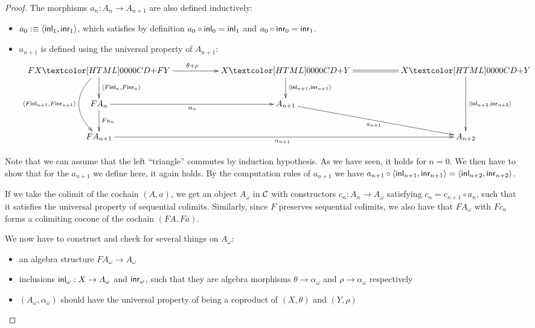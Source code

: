 \begin{proof}
  The morphisms $a_n : A_n \to A_{n+1}$ are also defined inductively:
  \begin{itemize}
  \item $a_0 \ddefeq \langle \inln{1}, \inrn{1} \rangle$, which
    satisfies by definition $a_0 \circ \inln{0} = \inln{1}$ and
    $a_0 \circ \inrn{0} = \inrn{1}$.
  \item $a_{n+1}$ is defined using the universal property of
    $A_{n+1}$:
    $$
    \xymatrix{
      \coproduct{FX}{FY} \ar[rr]^{\theta + \rho} \ar[d]^{\langle F \inln{n} , F \inrn{n} \rangle} 
      \ar@/_2pc/[dd]_{\langle F \inln{n+1} , F \inrn{n+1} \rangle}
      &&\coproduct{X}{Y} \ar[d]^{\langle \inln{n+1} , \inrn{n+1} \rangle} \ar@{=}[rr]
      &&\coproduct{X}{Y} \ar[dd]^{\langle \inln{n+2} , \inrn{n+2} \rangle} \\
      FA_n \ar[rr]_{\alpha_n} \ar[d]^{F a_n}
      &&A_{n+1} \ar[drr]_{a_{n+1}}
      \\
      FA_{n+1} \ar[rrrr]_{\alpha_{n+1}}
      &&&&A_{n+2}
    }
    $$
  \end{itemize}
  Note that we can assume that the left ``triangle'' commutes by
  induction hypothesis. As we have seen, it holds for $n = 0$. We then
  have to show that for the $a_{n+1}$ we define here, it again
  holds. By the computation rules of $a_{n+1}$ we have
  $a_{n+1} \circ \langle \inln{n+1} , \inrn{n+1} \rangle = \langle
  \inln{n+2} , \inrn{n+2} \rangle$.

  If we take the colimit of the cochain $(A,a)$, we get an object
  $A_{\omega}$ in $\mathcal{C}$ with constructors $c_n : A_n \to A_{\omega}$
  satisfying $c_n = c_{n+1} \circ a_n$, such that it satisfies the
  universal property of sequential colimits. Similarly, since $F$
  preserves sequential colimits, we also have that $FA_{\omega}$ with
  $Fc_n$ forms a colimiting cocone of the cochain $(FA,Fa)$.

  We now have to construct and check for several things on $A_{\omega}$:
  \begin{itemize}
  \item an algebra structure $F A_{\omega} \to A_{\omega}$
  \item inclusions $\inln{\omega} : X \to A_{\omega}$ and $\inrn{\omega}$, such that they are algebra morphisms $\theta \to \alpha_{\omega}$ and $\rho \to \alpha_{\omega}$ respectively
  \item $(A_{\omega} , \alpha_{\omega})$ should have the universal
    property of being a coproduct of $(X,\theta)$ and $(Y,\rho)$
  \end{itemize}



\end{proof}
